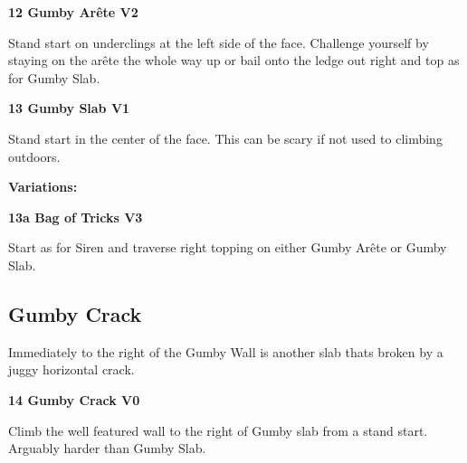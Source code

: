 	\begin{multicols}{2}


\needspace{1.5cm}
\label{rt:Gumby Arête}
\colorbox{green!20}{
\parbox{0.95\linewidth}{
\textbf{
12 Gumby Arête V2  
}}}

\begin{adjustwidth}{0.5cm}{}			
Stand start on underclings at the left side of the face. Challenge yourself by staying on the arête the whole way up or bail onto the ledge out right and top as for Gumby Slab.
\end{adjustwidth}



\needspace{1.5cm}
\label{rt:Gumby Slab}
\colorbox{green!20}{
\parbox{0.95\linewidth}{
\textbf{
13 Gumby Slab V1  
}}}

\begin{adjustwidth}{0.5cm}{}			
Stand start in the center of the face. This can be scary if not used to climbing outdoors.
\end{adjustwidth}

\begin{adjustwidth}{0.5cm}{}				
\needspace{3cm}
\textbf{Variations:} \newline

\needspace{1.5cm}
\label{vr:Bag of Tricks}
\colorbox{green!20}{
\parbox{0.95\linewidth}{
\textbf{
13a Bag of Tricks V3  
}}}

\begin{adjustwidth}{0.5cm}{}			
Start as for Siren and traverse right topping on either Gumby Arête or Gumby Slab.
\end{adjustwidth}


\end{adjustwidth}



\needspace{1.5cm}
\subsection*{Gumby Crack}\label{bf:Gumby Crack}
Immediately to the right of the Gumby Wall is another slab thats broken by a juggy horizontal crack.\\
	


\needspace{1.5cm}
\label{rt:Gumby Crack}
\colorbox{green!20}{
\parbox{0.95\linewidth}{
\textbf{
14 Gumby Crack V0  
}}}

\begin{adjustwidth}{0.5cm}{}			
Climb the well featured wall to the right of Gumby slab from a stand start. Arguably harder than Gumby Slab.
\end{adjustwidth}





\end{multicols}
